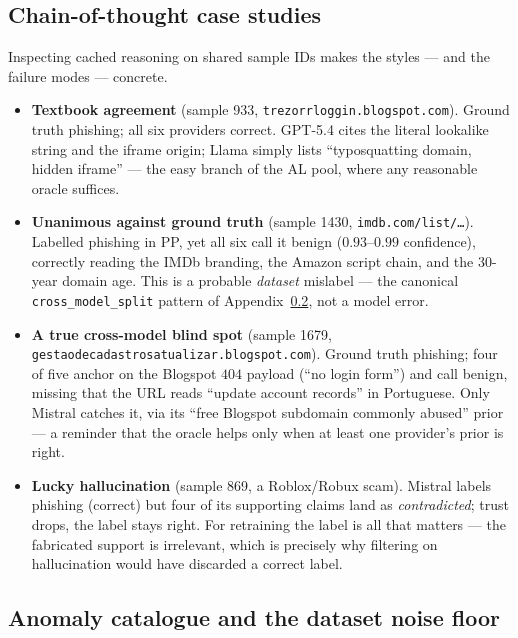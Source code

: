 \subsection{Chain-of-thought case studies}
\label{app:bench-cot}

Inspecting cached reasoning on shared sample IDs makes the styles --- and the
failure modes --- concrete.

\begin{itemize}[leftmargin=1.2em,itemsep=2pt,topsep=2pt]
\item \textbf{Textbook agreement} (sample 933,
\texttt{trezorrloggin.blogspot.com}). Ground truth phishing; all six providers
correct. GPT-5.4 cites the literal lookalike string and the iframe origin; Llama
simply lists ``typosquatting domain, hidden iframe'' --- the easy branch of the
AL pool, where any reasonable oracle suffices.
\item \textbf{Unanimous against ground truth} (sample 1430,
\texttt{imdb.com/list/\dots}). Labelled phishing in PP, yet all six call it benign
($0.93$--$0.99$ confidence), correctly reading the IMDb branding, the Amazon
script chain, and the 30-year domain age. This is a probable \emph{dataset}
mislabel --- the canonical \texttt{cross\_model\_split} pattern of
Appendix~\ref{app:bench-anom}, not a model error.
\item \textbf{A true cross-model blind spot} (sample 1679,
\texttt{gestaodecadastrosatualizar.blogspot.com}). Ground truth phishing; four of
five anchor on the Blogspot $404$ payload (``no login form'') and call benign,
missing that the URL reads ``update account records'' in Portuguese. Only Mistral
catches it, via its ``free Blogspot subdomain commonly abused'' prior --- a
reminder that the oracle helps only when at least one provider's prior is right.
\item \textbf{Lucky hallucination} (sample 869, a Roblox/Robux scam). Mistral
labels phishing (correct) but four of its supporting claims land as
\emph{contradicted}; trust drops, the label stays right. For retraining the label
is all that matters --- the fabricated support is irrelevant, which is precisely
why filtering on hallucination would have discarded a correct label.
\end{itemize}

\subsection{Anomaly catalogue and the dataset noise floor}
\label{app:bench-anom}

